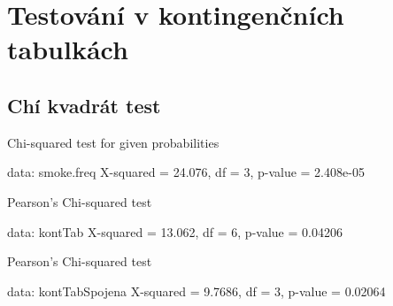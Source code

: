 \documentclass[a4paper]{ article}
\begin{document}
\section{Testování v kontingenčních tabulkách}
\subsection{Chí kvadrát test}
\begin{Schunk}
\begin{Soutput}
	Chi-squared test for given probabilities

data:  smoke.freq
X-squared = 24.076, df = 3, p-value = 2.408e-05
\end{Soutput}
\begin{Soutput}
	Pearson's Chi-squared test

data:  kontTab
X-squared = 13.062, df = 6, p-value = 0.04206
\end{Soutput}
\begin{Soutput}
	Pearson's Chi-squared test

data:  kontTabSpojena
X-squared = 9.7686, df = 3, p-value = 0.02064
\end{Soutput}
\end{Schunk}
\end{document}
